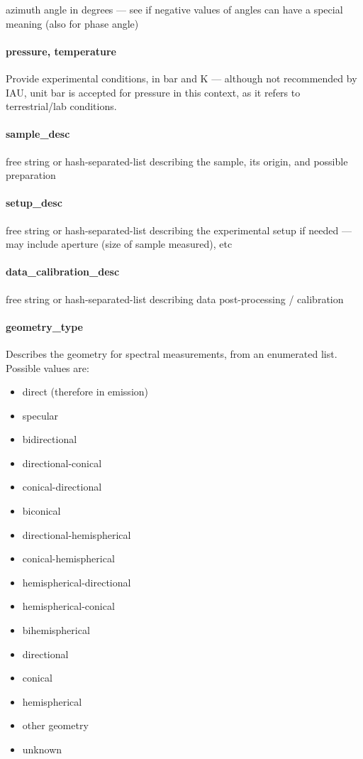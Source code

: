 \documentclass[11pt,a4paper]{ivoa}
\begin{document}
azimuth angle in degrees --- see if negative values of angles
can have a special meaning (also for phase angle)

\paragraph{pressure, temperature}

Provide experimental conditions, in bar and K --- although not recommended
by IAU, unit bar is accepted for pressure in this context, as it refers
to terrestrial/lab conditions.

\paragraph{sample\_desc}

free string or hash-separated-list describing the sample, its origin,
and possible preparation

\paragraph{setup\_desc}

free string or hash-separated-list describing the experimental setup if
needed --- may include aperture (size of sample measured), etc

\paragraph{data\_calibration\_desc}

free string or hash-separated-list describing data post-processing /
calibration

\paragraph{geometry\_type}

Describes the geometry for spectral measurements, from an enumerated list.
Possible values are:

\begin{itemize}
\item direct (therefore in emission)
\item specular
\item bidirectional
\item directional-conical
\item conical-directional
\item biconical
\item directional-hemispherical
\item conical-hemispherical
\item hemispherical-directional
\item hemispherical-conical
\item bihemispherical
\item directional
\item conical
\item hemispherical
\item other geometry
\item unknown
\end{itemize}
\end{document}
